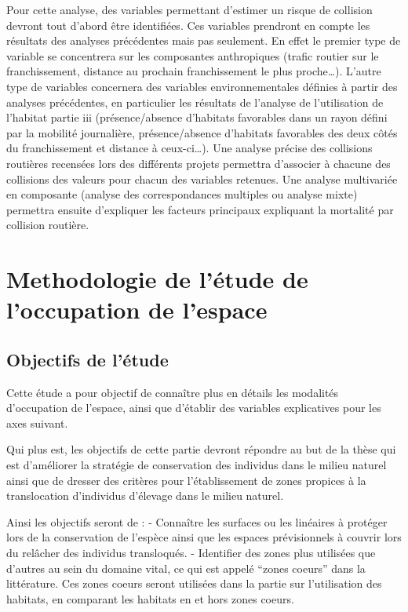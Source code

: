\documentclass[
  letterpaper,
  DIV=11,
  numbers=noendperiod]{scrreprt}
\begin{document}
Pour cette analyse, des variables permettant d'estimer un risque de
collision devront tout d'abord être identifiées. Ces variables prendront
en compte les résultats des analyses précédentes mais pas seulement. En
effet le premier type de variable se concentrera sur les composantes
anthropiques (trafic routier sur le franchissement, distance au prochain
franchissement le plus proche\ldots). L'autre type de variables
concernera des variables environnementales définies à partir des
analyses précédentes, en particulier les résultats de l'analyse de
l'utilisation de l'habitat partie iii (présence/absence d'habitats
favorables dans un rayon défini par la mobilité journalière,
présence/absence d'habitats favorables des deux côtés du franchissement
et distance à ceux-ci\ldots). Une analyse précise des collisions
routières recensées lors des différents projets permettra d'associer à
chacune des collisions des valeurs pour chacun des variables retenues.
Une analyse multivariée en composante (analyse des correspondances
multiples ou analyse mixte) permettra ensuite d'expliquer les facteurs
principaux expliquant la mortalité par collision routière.

\chapter{Methodologie de l'étude de l'occupation de
l'espace}\label{methodologie-de-luxe9tude-de-loccupation-de-lespace}

\section{Objectifs de l'étude}\label{objectifs-de-luxe9tude}

Cette étude a pour objectif de connaître plus en détails les modalités
d'occupation de l'espace, ainsi que d'établir des variables explicatives
pour les axes suivant.

Qui plus est, les objectifs de cette partie devront répondre au but de
la thèse qui est d'améliorer la stratégie de conservation des individus
dans le milieu naturel ainsi que de dresser des critères pour
l'établissement de zones propices à la translocation d'individus
d'élevage dans le milieu naturel.

Ainsi les objectifs seront de : - Connaître les surfaces ou les
linéaires à protéger lors de la conservation de l'espèce ainsi que les
espaces prévisionnels à couvrir lors du relâcher des individus
transloqués. - Identifier des zones plus utilisées que d'autres au sein
du domaine vital, ce qui est appelé ``zones coeurs'' dans la
littérature. Ces zones coeurs seront utilisées dans la partie sur
l'utilisation des habitats, en comparant les habitats en et hors zones
coeurs.
\end{document}
